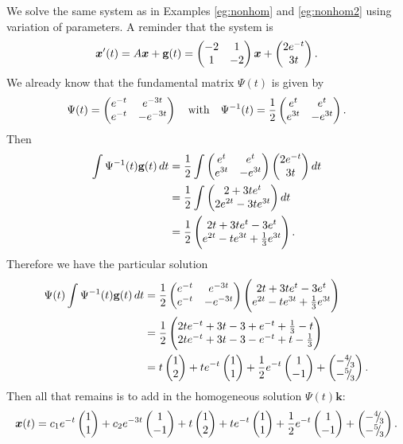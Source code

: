 \begin{eg}
	We solve the same system as in Examples \ref{eg:nonhom} and \ref{eg:nonhom2} using variation of parameters. A reminder that the system is
	\[
	\bm{x}'(t) = A\bm{x} + \textbf{g}(t) = \begin{pmatrix}-2&1\\1&-2\end{pmatrix} \bm{x} + \begin{pmatrix}2e^{-t}\\3t\end{pmatrix}.
	\]
	We already know that the fundamental matrix $\Psi(t)$ is given by
	\[
	\Psi(t) = \begin{pmatrix}e^{-t} & e^{-3t} \\ e^{-t} & -e^{-3t}\end{pmatrix} \quad \text{with} \quad \Psi^{-1}(t) = \frac12 \begin{pmatrix}e^t & e^t \\ e^{3t} & -e^{3t}\end{pmatrix}.
	\]
	Then
	\begin{align*}
		\int \Psi^{-1}(t) \textbf{g}(t) \,dt &= \frac12 \int \begin{pmatrix}e^t & e^t \\ e^{3t} & -e^{3t}\end{pmatrix} \begin{pmatrix}2e^{-t}\\3t\end{pmatrix} dt \\
		&= \frac12 \int \begin{pmatrix}2 + 3te^t \\ 2e^{2t} - 3te^{3t}\end{pmatrix} dt \\
		&= \frac12 \begin{pmatrix}2t + 3te^t - 3e^t \\ e^{2t} - te^{3t} + \frac13 e^{3t}\end{pmatrix}.
	\end{align*}
	Therefore we have the particular solution
	\begin{align*}
		\Psi(t) \int \Psi^{-1}(t) \textbf{g}(t) \,dt &= \frac12 \begin{pmatrix}e^{-t} & e^{-3t} \\ e^{-t} & -e^{-3t}\end{pmatrix} \begin{pmatrix}2t + 3te^t - 3e^t \\ e^{2t} - te^{3t} + \frac13 e^{3t}\end{pmatrix} \\
		&= \frac12 \begin{pmatrix}2te^{-t} + 3t-3+e^{-t} + \frac13 - t \\ 2te^{-t} + 3t - 3 - e^{-t} + t - \frac13\end{pmatrix} \\
		&= t\begin{pmatrix}1\\2\end{pmatrix} + te^{-t}\begin{pmatrix}1\\1\end{pmatrix} + \frac12e^{-t}\begin{pmatrix}1\\-1\end{pmatrix} + \begin{pmatrix}-{}^{4}{\mskip -5mu/\mskip -3mu}_{3} \\ -{}^{5}{\mskip -5mu/\mskip -3mu}_{3}\end{pmatrix}.
	\end{align*}
	Then all that remains is to add in the homogeneous solution $\Psi(t) \bm{k}$:
	\[
	\bm{x}(t) = c_1e^{-t}\begin{pmatrix}1\\1\end{pmatrix} + c_2e^{-3t}\begin{pmatrix}1\\-1\end{pmatrix} + t\begin{pmatrix}1\\2\end{pmatrix} + te^{-t}\begin{pmatrix}1\\1\end{pmatrix} + \frac12e^{-t}\begin{pmatrix}1\\-1\end{pmatrix} + \begin{pmatrix}-{}^{4}{\mskip -5mu/\mskip -3mu}_{3} \\ -{}^{5}{\mskip -5mu/\mskip -3mu}_{3}\end{pmatrix}.
	\]
\end{eg}


